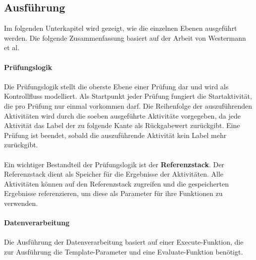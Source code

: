 \documentclass{article}
\begin{document}
    \subsection{Ausführung}
    Im folgenden Unterkapitel wird gezeigt, wie die einzelnen Ebenen ausgeführt werden.
    Die folgende Zusammenfassung basiert auf der Arbeit von Westermann et al.\\
    \\
    \textbf{Prüfungslogik}\\
    \\
    Die Prüfungslogik stellt die oberste Ebene einer Prüfung dar und wird als Kontrollfluss modelliert.
    Als Startpunkt jeder Prüfung fungiert die Startaktivität, die pro Prüfung nur einmal vorkommen darf.
    Die Reihenfolge der auszuführenden Aktivitäten wird durch die soeben ausgeführte Aktivitäte vorgegeben, da jede Aktivität das Label der zu folgende Kante als Rückgabewert zurückgibt.
    Eine Prüfung ist beendet, sobald die auszuführende Aktivität kein Label mehr zurückgibt.\\
    \\
    Ein wichtiger Bestandteil der Prüfungslogik ist der \textbf{Referenzstack}. Der Referenzstack dient als Speicher für die Ergebnisse der Aktivitäten.
    Alle Aktivitäten können auf den Referenzstack zugreifen und die gespeicherten Ergebnisse referenzieren, um diese als Parameter für ihre Funktionen zu verwenden.\\
    \\
    \textbf{Datenverarbeitung}\\
    \\
    Die Ausführung der Datenverarbeitung basiert auf einer Execute-Funktion, die zur Ausführung die Template-Parameter und eine Evaluate-Funktion benötigt.
\end{document}

